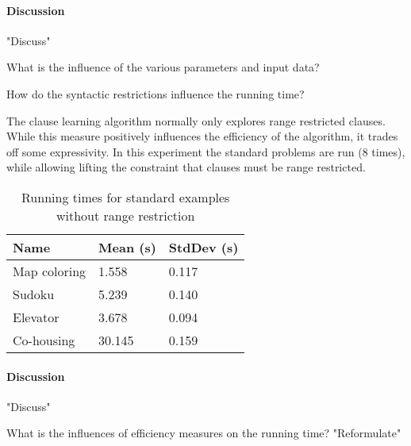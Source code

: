 
\paragraph{Discussion}
"Discuss"

\begin{question}
	What is the influence of the various parameters and input data?
\end{question}


\begin{question}
	How do the syntactic restrictions influence the running time?
\end{question}

\begin{experiment}
	The clause learning algorithm normally only explores range restricted clauses.
	While this measure positively influences the efficiency of the algorithm, it trades off some expressivity.
	In this experiment the standard problems are run ($8$ times), while allowing lifting the constraint that clauses must be range restricted.

	\begin{table}[!htp]
		\begin{tabularx}{\textwidth}{XXX}
			\textbf{Name}	& \textbf{Mean (s)}	& \textbf{StdDev (s)} \\
			\toprule
			Map coloring 	& 1.558				& 0.117 \\
			Sudoku 			& 5.239				& 0.140 \\
			Elevator 		& 3.678 			& 0.094 \\
			Co-housing 		& 30.145			& 0.159
		\end{tabularx}
		\label{tbl:exp_speed_standard}
		\caption{Running times for standard examples without range restriction}
	\end{table}

\end{experiment}

\paragraph{Discussion}
"Discuss"

\begin{question}
	What is the influences of efficiency measures on the running time? "Reformulate"
\end{question}

